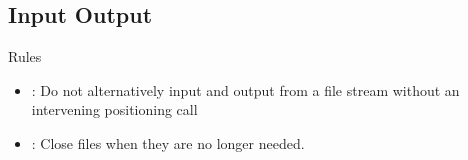 \subsection{Input Output}

\begin{frame}[t]{Rules}
\begin{itemize}
  \item {}: 
        Do not alternatively input and output from a file stream
        without an intervening positioning call
  \item {}: 
        Close files when they are no longer needed.
\end{itemize}
\end{frame}


